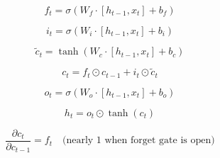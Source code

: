 
\begin{equation}
f_t = \sigma\left( W_f \cdot [h_{t-1}, x_t] + b_f \right)
\end{equation}

\begin{equation}
i_t = \sigma\left( W_i \cdot [h_{t-1}, x_t] + b_i \right)
\end{equation}

\begin{equation}
\tilde{c}_t = \tanh\left( W_c \cdot [h_{t-1}, x_t] + b_c \right)
\end{equation}

\begin{equation}
c_t = f_t \odot c_{t-1} + i_t \odot \tilde{c}_t
\end{equation}

\begin{equation}
o_t = \sigma\left( W_o \cdot [h_{t-1}, x_t] + b_o \right)
\end{equation}

\begin{equation}
h_t = o_t \odot \tanh(c_t)
\end{equation}

\begin{equation}
\frac{\partial c_t}{\partial c_{t-1}} = f_t \quad \text{(nearly 1 when forget gate is open)}
\end{equation}